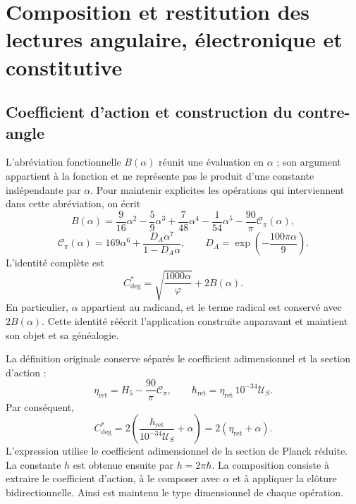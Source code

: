\section{Composition et restitution des lectures angulaire, électronique et constitutive}
\label{md:compos:seccion}

\subsection{Coefficient d’action et construction du contre-angle}
\label{md:compos:contraangulo}

L’abréviation fonctionnelle $B(\alpha)$ réunit une évaluation en $\alpha$ ; son
argument appartient à la fonction et ne représente pas le produit d’une constante
indépendante par $\alpha$. Pour maintenir explicites les opérations qui
interviennent dans cette abréviation, on écrit
\begin{equation}
 B(\alpha)=\frac{9}{16}\alpha^2-\frac{5}{9}\alpha^3
 +\frac{7}{48}\alpha^4-\frac{1}{54}\alpha^5
 -\frac{90}{\pi}\mathcal C_\pi(\alpha),
 \label{md:compos:b-alpha}
\end{equation}
\begin{equation}
 \mathcal C_\pi(\alpha)=169\alpha^6+
 \frac{D_A\alpha^7}{1-D_A\alpha},
 \qquad D_A=\exp\!\left(-\frac{100\pi\alpha}{9}\right).
 \label{md:compos:correccion-regional}
\end{equation}
L’identité complète est
\begin{equation}
 C^*_{\deg}=\sqrt{\frac{1000\alpha}{\varphi}}+2B(\alpha).
 \label{md:compos:contraangulo-abreviado}
\end{equation}
En particulier, $\alpha$ appartient au radicand, et le terme radical est
conservé avec $2B(\alpha)$. Cette identité réécrit l’application construite
auparavant et maintient son objet et sa généalogie.

La définition originale conserve séparés le coefficient adimensionnel et la
section d’action :
\begin{equation}
 \eta_{\mathrm{ret}}=H_5-\frac{90}{\pi}\mathcal C_\pi,
 \qquad
 \hbar_{\mathrm{ret}}=\eta_{\mathrm{ret}}\,10^{-34}\mathcal U_S.
 \label{md:compos:seccion-accion}
\end{equation}
Par conséquent,
\begin{equation}
 \boxed{C^*_{\deg}=2\left(
 \frac{\hbar_{\mathrm{ret}}}{10^{-34}\mathcal U_S}+\alpha\right)
 =2(\eta_{\mathrm{ret}}+\alpha).}
 \label{md:compos:contraangulo-accion}
\end{equation}
L’expression utilise le coefficient adimensionnel de la section de Planck
réduite. La constante $h$ est obtenue ensuite par $h=2\pi\hbar$.
La composition consiste à extraire le coefficient d’action, à le composer avec
$\alpha$ et à appliquer la clôture bidirectionnelle. Ainsi est maintenu le type
dimensionnel de chaque opération.

